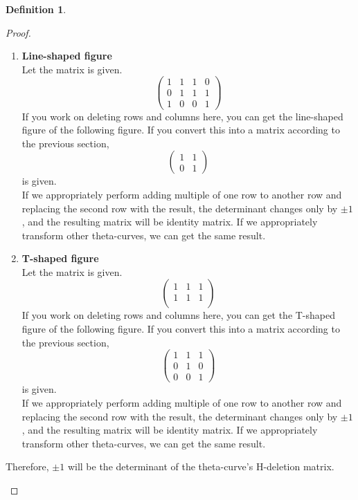 \documentclass{article}
\theoremstyle{definition}
\newtheorem{defn}[thm]{Definition}
\theoremstyle{theorem}
\theoremstyle{proposition}
\theoremstyle{corollary}
\begin{document}
\begin{defn}
\begin{proof}
\begin{enumerate}
\begin{enumerate}[label={(\roman*)}]
    \item \textbf{Line-shaped figure}\\
    Let the matrix is given.
    $$\begin{pmatrix}
        1 & 1 & 1 & 0\\
        0 & 1 & 1 & 1\\
        1 & 0 & 0 & 1
    \end{pmatrix}$$
    If you work on deleting rows and columns here, you can get the line-shaped figure of the following figure. If you convert this into a matrix according to the previous section,
    $$\begin{pmatrix}
        1 & 1 \\
        0 & 1
    \end{pmatrix}$$
    is given.\\
    If we appropriately perform adding multiple of one row to another row and replacing the second row with the result, the determinant changes only by $\pm 1$, and the resulting matrix will be identity matrix. If we appropriately transform other theta-curves, we can get the same result.
    \item \textbf{T-shaped figure}\\
    Let the matrix is given.
    $$\begin{pmatrix}
        1 & 1 & 1\\
        1 & 1 & 1\\
    \end{pmatrix}$$
    If you work on deleting rows and columns here, you can get the T-shaped figure of the following figure. If you convert this into a matrix according to the previous section,
    $$\begin{pmatrix}
        1 & 1 & 1\\
        0 & 1 & 0\\
        0 & 0 & 1
    \end{pmatrix}$$
    is given.\\
    If we appropriately perform adding multiple of one row to another row and replacing the second row with the result, the determinant changes only by $\pm 1$, and the resulting matrix will be identity matrix. If we appropriately transform other theta-curves, we can get the same result.
\end{enumerate}
Therefore, $\pm 1$ will be the determinant of the theta-curve's H-deletion matrix.


\end{enumerate}
\end{proof}
\end{defn}
\end{document}
